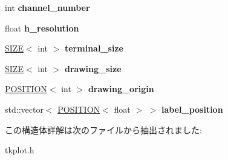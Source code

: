 \begin{DoxyCompactItemize}
\item 
\mbox{\label{struct_t_k_p_l_o_t_1_1_p_l_o_t_i_n_f_o_a801d16eb357241d4f4eeef8c6393bbc4}} 
int {\bfseries channel\+\_\+number}
\item 
\mbox{\label{struct_t_k_p_l_o_t_1_1_p_l_o_t_i_n_f_o_a8e6f18f0fb90610f38ca893614565c58}} 
float {\bfseries h\+\_\+resolution}
\item 
\mbox{\label{struct_t_k_p_l_o_t_1_1_p_l_o_t_i_n_f_o_afe6df040b952e6ab1e234d17de6023d0}} 
\hyperlink{class_t_k_p_l_o_t_1_1_s_i_z_e}{S\+I\+ZE}$<$ int $>$ {\bfseries terminal\+\_\+size}
\item 
\mbox{\label{struct_t_k_p_l_o_t_1_1_p_l_o_t_i_n_f_o_a27451bd9ddcd548bff9f91cdda6ed812}} 
\hyperlink{class_t_k_p_l_o_t_1_1_s_i_z_e}{S\+I\+ZE}$<$ int $>$ {\bfseries drawing\+\_\+size}
\item 
\mbox{\label{struct_t_k_p_l_o_t_1_1_p_l_o_t_i_n_f_o_ad5e1f688a044784cf24846d04fd48116}} 
\hyperlink{class_t_k_p_l_o_t_1_1_p_o_s_i_t_i_o_n}{P\+O\+S\+I\+T\+I\+ON}$<$ int $>$ {\bfseries drawing\+\_\+origin}
\item 
\mbox{\label{struct_t_k_p_l_o_t_1_1_p_l_o_t_i_n_f_o_a4266fd64b26c45e727843dc017ba2a3d}} 
std\+::vector$<$ \hyperlink{class_t_k_p_l_o_t_1_1_p_o_s_i_t_i_o_n}{P\+O\+S\+I\+T\+I\+ON}$<$ float $>$ $>$ {\bfseries label\+\_\+position}
\end{DoxyCompactItemize}


この構造体詳解は次のファイルから抽出されました\+:\begin{DoxyCompactItemize}
\item 
tkplot.\+h\end{DoxyCompactItemize}
